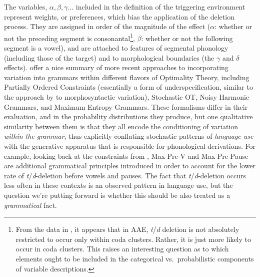 The variables, $\alpha, \beta, \gamma \ldots$ included in the definition of the triggering environment represent weights, or preferences, which bias the application of the deletion process. 
They are assigned in order of the magnitude of the effect ($\alpha$: whether or not the preceding segment is consonantal\footnote{From the data in \citet{3288}, it appears that in AAE, {\sl t}/{\sl d} deletion is not absolutely restricted to occur only within coda clusters.
Rather, it is just more likely to occur in coda clusters.
This raises an interesting question as to which elements ought to be included in the categorical vs.\ probabilistic components of variable descriptions.},
$\beta$: whether or not the following segment is a vowel), and are attached to features of segmental phonology (including those of the target) and to morphological boundaries (the $\gamma$ and $\delta$ effects).
\citet{Coetzee2011} offer a nice summary of more recent approaches to incorporating variation into grammars within different flavors of Optimality Theory, including Partially Ordered Constraints (essentially a form of underspecification, similar to the approach by \citet{adger2006} to morphosyntactic variation), Stochastic OT, Noisy Harmonic Grammars, and Maximum Entropy Grammars.
These formalisms differ in their evaluation, and in the probability distributions they produce, but one qualitative similarity between them is that they all encode the conditioning of variation \emph{within the grammar}, thus explicitly conflating stochastic patterns of \textsl{language use} with the generative apparatus that is responsible for phonological derivations.
For example, looking back at the constraints from \citet{Coetzee2012}, {\sc Max-Pre-V} and {\sc Max-Pre-Pause} are additional grammatical principles introduced in order to account for the lower rate of {\sl t}/{\sl d}-deletion before vowels and pauses.
The fact that {\sl t}/{\sl d}-deletion occurs less often in these contexts is an observed pattern in language use, but the question we're putting forward is whether this should be also treated as a \emph{grammatical} fact.


